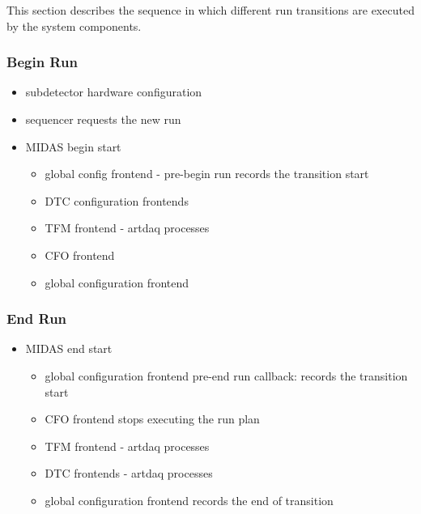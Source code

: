 This section describes the sequence in which different run transitions
are executed by the system components.


\subsubsection{Begin Run}
\begin{itemize}
\item
  subdetector hardware configuration
\item
  sequencer requests the new run
\item
  MIDAS begin start
  \begin{itemize}
  \item
    global config frontend - pre-begin run records the transition start
  \item
    DTC configuration frontends 
  \item
    TFM frontend - artdaq processes
  \item
    CFO frontend 
  \item
    global configuration frontend
  \end{itemize}
\end{itemize}

\subsubsection{End Run}
\begin{itemize}
\item
  MIDAS end start
  \begin{itemize}
  \item
    global configuration frontend pre-end run callback: records
    the transition start
  \item
    CFO frontend stops executing the run plan
  \item
    TFM frontend - artdaq processes
  \item
    DTC frontends - artdaq processes
  \item
    global configuration frontend records the end of transition
  \end{itemize}
\end{itemize}


